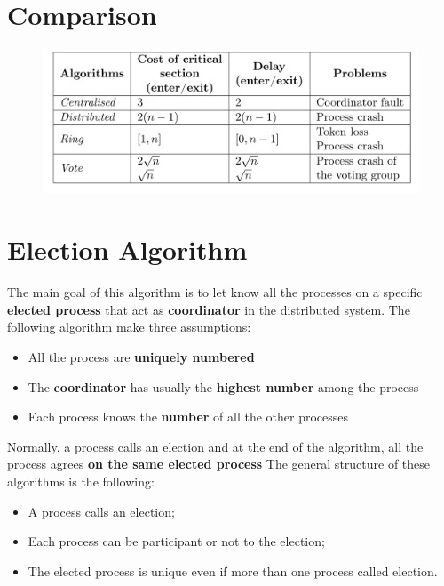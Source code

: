 \newpage
\section{Comparison}
\begin{figure}[!h]
    \centering
    \includegraphics[width=.8\linewidth]{images/SynchronizationCoordinationDS/table.jpeg}
\end{figure}

\section{Election Algorithm}
The main goal of this algorithm is to let know all the processes on a specific \textbf{elected process} that act as \textbf{coordinator} in the distributed system. The following algorithm make three assumptions:
\begin{itemize}
    \item All the process are \textbf{uniquely numbered}
    \item The \textbf{coordinator} has usually the \textbf{highest number} among the process
    \item Each process knows the \textbf{number} of all the other processes 
\end{itemize}
Normally, a process calls an election and at the end of the algorithm, all the process agrees \textbf{on the same elected process}
The general structure of these algorithms is the following:
\begin{itemize}
    \item A process calls an election;
    \item Each process can be participant or not to the election;
    \item The elected process is unique even if more than one process called election.
\end{itemize}

